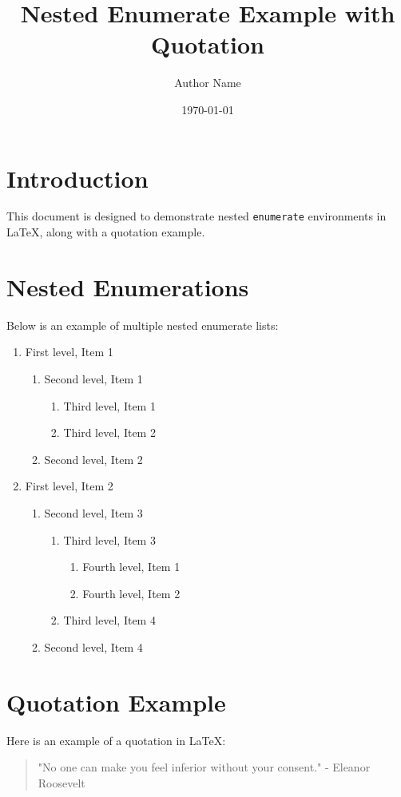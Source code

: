 \documentclass{article}
\title{Nested Enumerate Example with Quotation}
\author{Author Name}
\date{\today}
\begin{document}
\maketitle

\section{Introduction}
This document is designed to demonstrate nested \texttt{enumerate} environments in LaTeX, along with a quotation example.

\section{Nested Enumerations}
Below is an example of multiple nested enumerate lists:

\begin{enumerate}
    \item First level, Item 1
        \begin{enumerate}
            \item Second level, Item 1
                \begin{enumerate}
                    \item Third level, Item 1
                    \item Third level, Item 2
                \end{enumerate}
            \item Second level, Item 2
        \end{enumerate}
    \item First level, Item 2
        \begin{enumerate}
            \item Second level, Item 3
                \begin{enumerate}
                    \item Third level, Item 3
                        \begin{enumerate}
                            \item Fourth level, Item 1
                            \item Fourth level, Item 2
                        \end{enumerate}
                    \item Third level, Item 4
                \end{enumerate}
            \item Second level, Item 4
        \end{enumerate}
\end{enumerate}

\section{Quotation Example}
Here is an example of a quotation in LaTeX:

\begin{quotation}
"No one can make you feel inferior without your consent." - Eleanor Roosevelt
\end{quotation}
\end{document}

